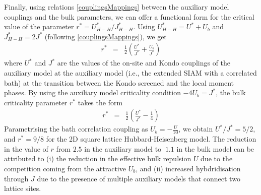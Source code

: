 \documentclass[reprint,hidelinks]{revtex4-2}
\begin{document}
\begin{widetext}
Finally, using relations \eqref{couplingsMappings} between the auxiliary model couplings and the bulk parameters, we can offer a functional form for the critical value of the parameter $r^{*} = U_{H-H}^{*}/J_{H-H}^{*}$. Using \(U_{H-H}^{*} = U^* + U_b\) and \(J_{H-H}^{*} = 2J^*\) (following \eqref{couplingsMappings}), we get
\begin{equation}\begin{aligned}
	r^{*} &=& \frac{1}{2}\left(\frac{U^{*}}{J^{*}} + \frac{U_b}{J^*}\right)
\end{aligned}\end{equation}
where $U^{*}$ and $J^{*}$ are the values of the on-site and Kondo couplings of the auxiliary model at the auxiliary model (i.e., the extended SIAM with a correlated bath) at the transition between the Kondo screened and the local moment phases. By using the auxiliary model criticality condition \(-4U_b = J^*\), the bulk criticality parameter \(r^*\) takes the form
\begin{equation}\begin{aligned}
	r^{*} &=& \frac{1}{2}\left(\frac{U^{*}}{J^{*}} - \frac{1}{4}\right)
\end{aligned}\end{equation}
Parametrising the bath correlation coupling as $U_{b}=-\frac{U}{10}$, we obtain $U^{*}/J^{*}=5/2$, and $r^{*} = 9/8$ for the 2D square lattice Hubbard-Heisenberg model. The reduction in the value of \(r\) from \(2.5\) in the auxiliary model to \(~1.1\) in the bulk model can be attributed to (i) the reduction in the effective bulk repulsion \(U\) due to the competition coming from the attractive \(U_b\), and (ii) increased hybdridisation through \(J\) due to the presence of multiple auxiliary models that connect two lattice sites.


\end{widetext}
\end{document}
